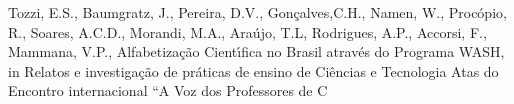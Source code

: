 \documentclass[
12pt,		%
openright,	%
twoside,  %
a4paper,			%
chapter=TITLE,		%
english,			%
french,				%
spanish,			%
brazil				%
]{USPSC-classe/USPSC}
\begin{document}
\begin{flushleft}
\begin{flushleft}
\begin{flushleft}
\begin{flushleft}
\begin{flushleft}
\begin{flushleft}
\begin{flushleft}
\begin{flushleft}
\begin{flushleft}
\begin{flushleft}
[TOZZI, 2021a] Tozzi, E.S., Baumgratz, J., Pereira, D.V., Gon\c{c}alves,C.H., Namen, W., Proc\'opio, R., Soares, A.C.D., Morandi, M.A., Ara\'ujo, T.L, Rodrigues, A.P., Accorsi, F., Mammana, V.P., Alfabetiza\c{c}\~ao Cient\'{\i}fica no Brasil atrav\'es do Programa WASH, in Relatos e investiga\c{c}\~ao de pr\'aticas de ensino de Ci\^encias e Tecnologia Atas do Encontro internacional “A Voz dos Professores de C
\end{flushleft}


\end{flushleft}


\end{flushleft}


\end{flushleft}


\end{flushleft}


\end{flushleft}


\end{flushleft}


\end{flushleft}


\end{flushleft}


\end{flushleft}
\end{document}
